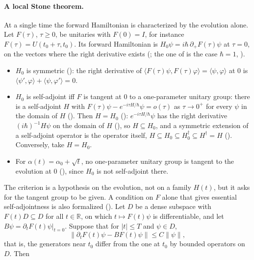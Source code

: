 \documentclass[11pt]{article}
\begin{document}
\paragraph{A local Stone theorem.} At a single time the forward Hamiltonian is characterized by
the evolution alone. Let $F(\tau)$, $\tau \ge 0$, be unitaries with $F(0) = I$, for instance
$F(\tau) = U(t_0+\tau,t_0)$. Its forward Hamiltonian is $H_0\psi = i\hbar\,\partial_+F(\tau)\psi$
at $\tau = 0$, on the vectors where the right derivative exists
(; the one of  is the case
$\hbar = 1$, ).
\begin{itemize}
\item $H_0$ is symmetric (): the right derivative of
  $\langle F(\tau)\psi, F(\tau)\varphi\rangle = \langle\psi,\varphi\rangle$ at $0$ is
  $\langle\psi',\varphi\rangle + \langle\psi,\varphi'\rangle = 0$.
\item $H_0$ is self-adjoint iff $F$ is tangent at $0$ to a one-parameter unitary group: there is a
  self-adjoint $H$ with $F(\tau)\psi - e^{-i\tau H/\hbar}\psi = o(\tau)$ as $\tau \to 0^+$ for
  every $\psi$ in the domain of $H$ (). Then $H = H_0$
  (): $e^{-i\tau H/\hbar}\psi$ has the right derivative
  $(i\hbar)^{-1}H\psi$ on the domain of $H$ (), so
  $H \subseteq H_0$, and a symmetric extension of a self-adjoint operator is the operator itself,
  $H \subseteq H_0 \subseteq H_0^\dagger \subseteq H^\dagger = H$
  (). Conversely, take $H = H_0$.
\item For $\alpha(t) = \alpha_0 + \sqrt t$, no one-parameter unitary group is tangent to the
  evolution at $0$ (), since $H_0$ is not self-adjoint there.
\end{itemize}
The criterion is a hypothesis on the evolution, not on a family $H(t)$, but it asks for the
tangent group to be given. A condition on $F$ alone that gives essential self-adjointness is
also formalized (). Let $D$ be a dense
subspace with $F(t)D \subseteq D$ for all $t \in \mathbb{R}$, on which $t \mapsto F(t)\psi$ is
differentiable, and let $B\psi = \partial_t F(t)\psi|_{t=0}$. Suppose that for $|t| \le T$ and
$\psi \in D$,
\[ \|\partial_t F(t)\psi - B F(t)\psi\| \le C\|\psi\|, \]
that is, the generators near $t_0$ differ from the one at $t_0$ by bounded operators on $D$. Then
\end{document}
